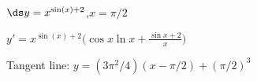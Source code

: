 {$\ds y=x^{\sin (x)+2}$,\quad $x=\pi/2$
}
{$y'= x^{\sin (x)+2}\big(\cos x\ln x+\frac{\sin x+2}{x}\big)$

Tangent line: $y = (3\pi^2/4)(x-\pi/2)+(\pi/2)^3$
}
